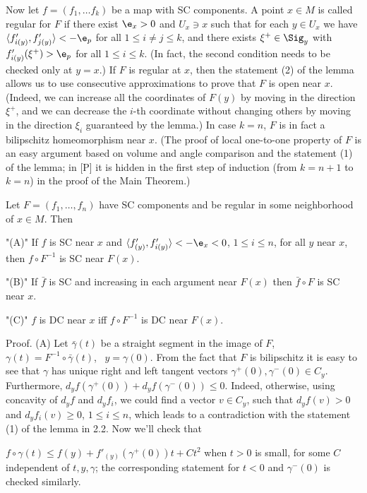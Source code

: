 Now let $f=(f_1,\dots f_k)$ be a map with SC components. A point $x\in M$
is called regular for $F$ if there exist $\e_x > 0$ and $U_x\ni x$ such that for
each $y\in U_x$ we have $\langle f'_{i(y)},f'_{j(y)}\rangle < -\e_p$
for all $1\leq i\neq j\leq k$, and there exists $\xi^+\in\Sig_y$ with
$f'_{i(y)}(\xi^+) > \e_p$ for all $1\leq i\leq k$. (In fact, the second
condition
needs to be checked only at $y=x$.) If $F$ is regular at $x$, then the
statement (2)
of the lemma allows us to use consecutive approximations to prove that $F$ is open
near $x$. (Indeed, we can increase all the coordinates of $F(y)$ by moving
in the
direction $\xi^+$, and we can decrease the $i$-th coordinate without
changing others
by moving in the direction $\xi_i$ guaranteed by the lemma.) In case $k=n$,
$F$ is
in fact a bilipschitz homeomorphism near $x$. (The proof of local one-to-one
property of $F$ is an easy argument based on volume and angle comparison and the
statement (1) of the lemma; in [P] it is hidden in the first step of
induction (from
$k=n+1$ to $k=n$) in the proof of the Main Theorem.)

\bigskip
{}\endspecialhead

 Let $F=(f_1,\dots ,f_n)$ have SC components and be
regular in
some neighborhood of $x\in M$. Then
\roster
\item"(A)" If $f$ is SC near $x$ and $\langle f'_{(y)},f'_{i(y)}\rangle <
-\e_x < 0$,
  $1\leq i \leq n$, for all $y$ near $x$,\newline
  then $f\circ F^{-1}$ is SC near $F(x)$.
\item"(B)" If $\bar f$ is SC and increasing in each argument near $F(x)$ then
  $\bar f\circ F$ is SC near $x$.
\item"(C)" $f$ is DC near $x$ iff $f\circ F^{-1}$ is DC near $F(x)$.
\endroster
\endproclaim

{\smc Proof}. (A) Let $\bar\gamma(t)$ be a straight segment in the image of $F$,
$\gamma(t)=F^{-1}\circ\bar\gamma(t)$, \ $y=\gamma(0)$. From the fact that $F$ is
bilipschitz it is easy to see that $\gamma$ has unique right and left
tangent vectors
$\gamma^+(0),\gamma^-(0)\in C_y$. Furthermore, $d_y f(\gamma^+(0))+d_y
f(\gamma^-(0))\leq 0$. Indeed, otherwise, using concavity of $d_yf$ and
$d_yf_i$, we
could find a vector $v\in C_y$, such that $d_yf(v) > 0$ and $d_yf_i(v)\geq 0$,
$1\leq i\leq n$, which leads to a contradiction with the statement (1) of
the lemma
in 2.2. Now we'll check that

\roster
\item $f\circ\gamma (t)\leq f(y)+f'_{(y)} (\gamma^+(0))t+Ct^2$ when $t > 0$ is
small, for some $C$ independent of $t,y,\gamma$; the corresponding statement for
$t < 0$ and $\gamma^-(0)$ is checked similarly.
\endroster

